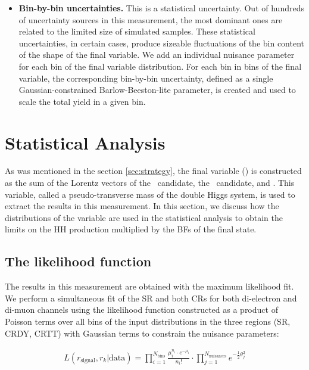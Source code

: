 \begin{itemize}
\item{\bf Bin-by-bin uncertainties.} 
This is a statistical uncertainty. Out of hundreds of uncertainty sources in this measurement, the most dominant ones are related to the limited size of simulated samples. These statistical uncertainties, in certain cases, produce sizeable fluctuations of the bin content of the shape of the final variable. We add an individual nuisance parameter for each bin of the final variable distribution. For each bin in bins of the final variable, the corresponding bin-by-bin uncertainty, defined as a single Gaussian-constrained Barlow-Beeston-lite parameter, is created and used to scale the total yield in a given bin.

\end{itemize}

\section{Statistical Analysis}
\label{sec:statistics}

As was mentioned in the section \ref{sec:strategy}, the final variable (\mTHH) is constructed as the sum of the Lorentz  vectors  of  the \Zll ~candidate, the \HBB~candidate, and \PTslash. This variable, called a pseudo-transverse mass of the double Higgs system, is used to extract the results in this measurement. In this section, we discuss how the distributions of the \mTHH variable are used in the statistical analysis to obtain the limits on the HH production multiplied by the BFs of the final state.

\subsection{The likelihood function}
\label{sec:likelihood}

The results in this measurement are obtained with the maximum likelihood fit. We perform a simultaneous fit of the SR and both CRs for both di-electron and di-muon channels using the likelihood function constructed as a product of Poisson terms over all bins of the input \mTHH distributions in the three regions (SR, CRDY, CRTT) with Gaussian terms to constrain the nuisance parameters:

\begin{align*}
 L(r_{\text{signal}}, r_{k}|\text{data}) = \prod_{i=1}^{N_{\mathrm{bins}}}\frac{\mu_{i}^{n_{i}}\cdot e^{-\mu_{i}}}{n_{i}!}
\cdot \prod_{j=1}^{N_{\mathrm{nuisances}}} e^{-\frac{1}{2}\theta_{j}^{2}}
\end{align*}

